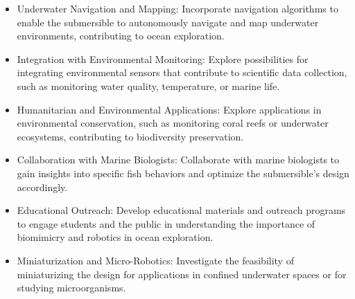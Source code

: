 \begin{itemize}
    \item Underwater Navigation and Mapping: Incorporate navigation algorithms to enable the submersible to autonomously navigate and map underwater environments, contributing to ocean exploration.
    \item Integration with Environmental Monitoring: Explore possibilities for integrating environmental sensors that contribute to scientific data collection, such as monitoring water quality, temperature, or marine life.
    \item Humanitarian and Environmental Applications: Explore applications in environmental conservation, such as monitoring coral reefs or underwater ecosystems, contributing to biodiversity preservation.
    \item Collaboration with Marine Biologists: Collaborate with marine biologists to gain insights into specific fish behaviors and optimize the submersible's design accordingly.
    \item Educational Outreach: Develop educational materials and outreach programs to engage students and the public in understanding the importance of biomimicry and robotics in ocean exploration.
    \item Miniaturization and Micro-Robotics: Investigate the feasibility of miniaturizing the design for applications in confined underwater spaces or for studying microorganisms.    
\end{itemize}